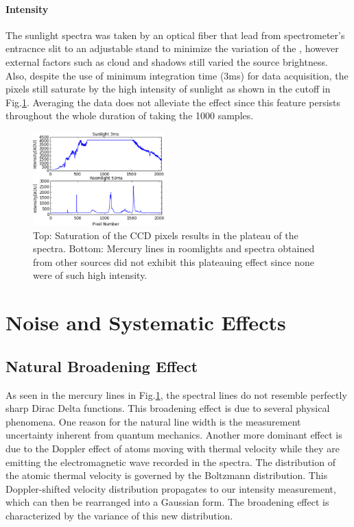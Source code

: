 \documentclass[authoryear, 12pt,5p, times]{elsarticle}
\begin{document}
\paragraph*{\textbf{Intensity}}
The sunlight spectra was taken by an optical fiber that lead from spectrometer's entracnce slit to an adjustable stand to minimize the variation of the , however external factors such as cloud and shadows still varied the source brightness. Also,  despite the use of minimum integration time (3ms) for data acquisition,  the pixels still saturate by the high intensity of sunlight as shown in the cutoff in Fig.\ref{sunlight}. Averaging the data does not alleviate the effect since this feature persists throughout the whole duration of taking the 1000 samples. 
 \begin{figure}[h!]
	\includegraphics[width=0.45\textwidth]{figures/sunlight_saturated}
\caption{Top: Saturation of the CCD pixels results in the plateau of the spectra. Bottom: Mercury lines in roomlights and spectra obtained from other sources did not exhibit this plateauing effect since none were of such high intensity.}
\label{sunlight}
	\end{figure}
\section{Noise and Systematic Effects}
	 \subsection{Natural Broadening Effect}
 As seen in the mercury lines in Fig.\ref{sunlight}, the spectral lines do not resemble perfectly sharp Dirac Delta functions. This broadening effect is due to several physical phenomena. One reason for  the natural line width is the measurement uncertainty inherent from quantum mechanics. Another more dominant effect is due to the Doppler effect of atoms moving with thermal velocity while they are emitting the electromagnetic wave recorded in the spectra. The distribution of the atomic thermal velocity is governed by the Boltzmann distribution. This Doppler-shifted velocity distribution propagates to our intensity measurement, which can then be rearranged into a Gaussian form. The broadening effect is characterized by the variance of this new distribution.
\end{document}

